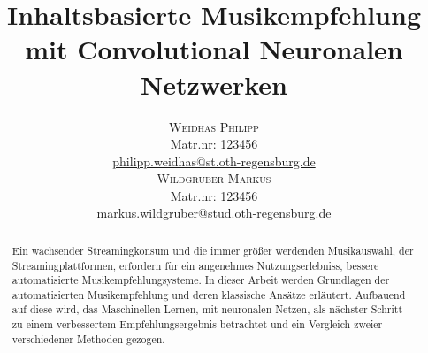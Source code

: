 \documentclass[twosided,a4,10pt]{article}
\title{\vspace{-5mm}%
	\fontsize{20pt}{10pt}\selectfont
	\textbf{Inhaltsbasierte Musikempfehlung mit Convolutional Neuronalen Netzwerken}
}
\author{
	\large\begin{minipage}[t]{0.5\linewidth}
		\begin{center}
			\textsc{Weidhas Philipp}\\[2mm]
			\normalsize	Matr.nr: 123456\\
			\normalsize
			\href{mailto:philipp.weidhas@st.oth-regensburg.de}
			{philipp.weidhas@st.oth-regensburg.de}
		\end{center}
	\end{minipage}
	\begin{minipage}[t]{0.5\linewidth}
		\begin{center}
			\textsc{Wildgruber Markus}\\[2mm]
			\normalsize	Matr.nr: 123456\\
			\normalsize
			\href{mailto:markus.wildgruber@stud.oth-regensburg.de}
			{markus.wildgruber@stud.oth-regensburg.de}
		\end{center}
	\end{minipage}
}
\begin{document}
	\maketitle
	\thispagestyle{fancy}
	\begin{multicols}{2}
		\begin{abstract}
			\noindent Ein wachsender Streamingkonsum und die immer größer werdenden Musikauswahl, der Streamingplattformen, erfordern für ein angenehmes Nutzungserlebniss, bessere automatisierte Musikempfehlungsysteme. In dieser Arbeit werden Grundlagen der automatisierten Musikempfehlung und deren klassische Ansätze erläutert. Aufbauend auf diese wird, das Maschinellen Lernen, mit neuronalen Netzen, als nächster Schritt zu einem verbessertem Empfehlungsergebnis betrachtet und ein Vergleich zweier verschiedener Methoden gezogen.
		\end{abstract}

\end{multicols}
\end{document}
